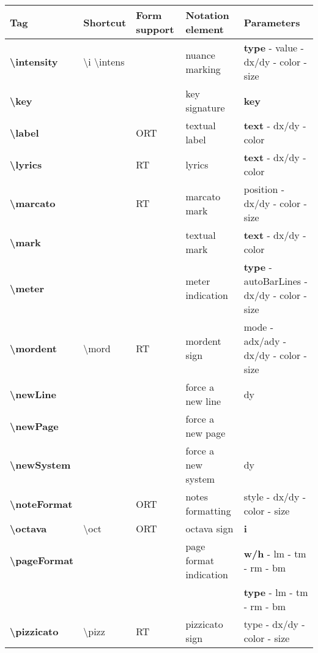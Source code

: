 \documentclass[a4paper, landscape, 10pt]{article}
\begin{document}
\begin{tabularx}{\linewidth}{p{3cm}p{4.5cm}p{3cm}p{5.5cm}l}
    \hline
    \textbf{Tag}&\textbf{Shortcut}&\textbf{Form support}&\textbf{Notation element}&\textbf{Parameters}\\
    \hline
    \textbf{\textbackslash{}intensity}&\textbackslash{}i \textbackslash{}intens&&nuance marking&\textbf{type} - value - dx/dy - color - size\\
    \hline
    \textbf{\textbackslash{}key}&&&key signature&\textbf{key}\\
    \hline
    \textbf{\textbackslash{}label}&&ORT&textual label&\textbf{text} - dx/dy - color\\
    \hline
    \textbf{\textbackslash{}lyrics}&&RT&lyrics&\textbf{text} - dx/dy - color\\
    \hline
    \textbf{\textbackslash{}marcato}&&RT&marcato mark&position - dx/dy - color - size\\
    \hline
    \textbf{\textbackslash{}mark}&&&textual mark&\textbf{text} - dx/dy - color\\
    \hline
    \textbf{\textbackslash{}meter}&&&meter indication&\textbf{type} - autoBarLines - dx/dy - color - size\\
    \hline
    \textbf{\textbackslash{}mordent}&\textbackslash{}mord&RT&mordent sign&mode - adx/ady - dx/dy - color - size\\
    \hline
    \textbf{\textbackslash{}newLine}&&&force a new line&dy\\ %
    \hline
    \textbf{\textbackslash{}newPage}&&&force a new page&\\
    \hline
    \textbf{\textbackslash{}newSystem}&&&force a new system&dy\\ %
    \hline
    \textbf{\textbackslash{}noteFormat}&&ORT&notes formatting&style - dx/dy - color - size\\
    \hline
    \textbf{\textbackslash{}octava}&\textbackslash{}oct&ORT&octava sign&\textbf{i}\\
    \hline
    \textbf{\textbackslash{}pageFormat}&&&page format indication&\textbf{w/h} - lm - tm - rm - bm\\
    &&&&\textbf{type} - lm - tm - rm - bm\\
    \hline
    \textbf{\textbackslash{}pizzicato}&\textbackslash{}pizz&RT&pizzicato sign&type - dx/dy - color - size\\

\end{tabularx}
\end{document}
